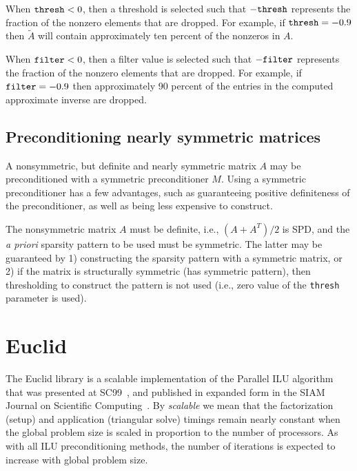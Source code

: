 When ${\tt thresh} < 0$, then a threshold is selected such that 
$-{\tt thresh}$ represents the fraction of the nonzero elements
that are dropped.  For example, if ${\tt thresh} = -0.9$ then
$\tilde{A}$ will contain approximately ten percent of the nonzeros
in $A$.

When ${\tt filter} < 0$, then a filter value is selected such that 
$-{\tt filter}$ represents the fraction of the nonzero elements
that are dropped.  For example, if ${\tt filter} = -0.9$ then
approximately 90 percent of the entries in the computed approximate 
inverse are dropped.


\subsection{Preconditioning nearly symmetric matrices}
\label{nearly}

A nonsymmetric, but definite and nearly symmetric matrix $A$ 
may be preconditioned
with a symmetric preconditioner $M$.  Using a symmetric preconditioner
has a few advantages, such as guaranteeing positive
definiteness of the preconditioner, as well as being less expensive
to construct.

The nonsymmetric matrix $A$ must be definite,
i.e., $(A+A^T)/2$ is SPD, and the {\em a priori} sparsity pattern to be used
must be symmetric.  The latter may be guaranteed by 1) 
constructing the sparsity pattern with a symmetric matrix, or 2) if the
matrix is structurally symmetric (has symmetric pattern), then
thresholding to construct the pattern is not used (i.e.,
zero value of the {\tt thresh} parameter is used).


\section{Euclid}

The Euclid library is a scalable implementation of the Parallel ILU algorithm
that was presented at SC99~\cite{DHysom_APothen_1999}, and published in
expanded form in the SIAM Journal on Scientific
Computing~\cite{DHysom_APothen_2001}.  By {\em scalable} we mean that the
factorization (setup) and application (triangular solve) timings remain nearly
constant when the global problem size is scaled in proportion to the number of
processors.  As with all ILU preconditioning methods, the number of iterations
is expected to increase with global problem size.

